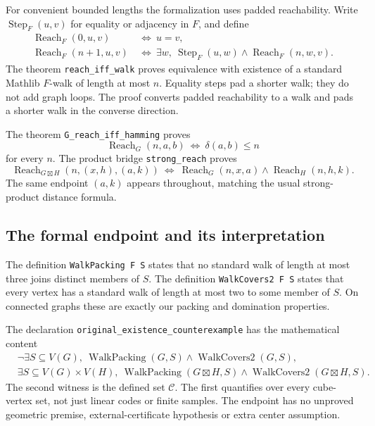 \documentclass[11pt]{article}
\theoremstyle{definition}
\theoremstyle{remark}
\newcommand{\Reach}{\operatorname{Reach}}
\newcommand{\code}{\mathcal C}
\begin{document}
For convenient bounded lengths the formalization uses padded
reachability. Write \(\operatorname{Step}_F(u,v)\) for equality
or adjacency in \(F\), and define
\begin{align*}
 \Reach_F(0,u,v)&\ \Longleftrightarrow\ u=v,\\
 \Reach_F(n+1,u,v)&\ \Longleftrightarrow\
   \exists w,\ \operatorname{Step}_F(u,w)\land\Reach_F(n,w,v).
\end{align*}
The theorem \texttt{reach\_iff\_walk} proves equivalence with
existence of a standard Mathlib \(F\)-walk of length at most \(n\).
Equality steps pad a shorter walk; they do not add graph loops.
The proof converts padded reachability to a walk and pads a
shorter walk in the converse direction.

The theorem \texttt{G\_reach\_iff\_hamming} proves
\[
 \Reach_G(n,a,b)\ \Longleftrightarrow\ \delta(a,b)\le n
\]
for every \(n\). The product bridge \texttt{strong\_reach} proves
\[
 \Reach_{G\boxtimes H}(n,(x,h),(a,k))
 \ \Longleftrightarrow\
 \Reach_G(n,x,a)\land\Reach_H(n,h,k).
\]
The same endpoint \((a,k)\) appears throughout, matching the
usual strong-product distance formula.

\subsection{The formal endpoint and its interpretation}
The definition \texttt{WalkPacking F S} states that no standard
walk of length at most three joins distinct members of \(S\).
The definition \texttt{WalkCovers2 F S} states that every vertex
has a standard walk of length at most two to some member of \(S\).
On connected graphs these are exactly our packing and domination
properties.

The declaration \texttt{original\_existence\_counterexample}
has the mathematical content
\begin{align}
 &\neg\exists S\subseteq V(G),\
        \operatorname{WalkPacking}(G,S)
        \land\operatorname{WalkCovers2}(G,S),
       \label{eq:formal-factor}\\
 &\exists S\subseteq V(G)\times V(H),\
        \operatorname{WalkPacking}(G\boxtimes H,S)
        \land\operatorname{WalkCovers2}(G\boxtimes H,S).
       \label{eq:formal-product}
\end{align}
The second witness is the defined set \(\code\).
The first quantifies over every cube-vertex set, not just linear
codes or finite samples. The endpoint has no unproved geometric
premise, external-certificate hypothesis or extra center assumption.
\end{document}
